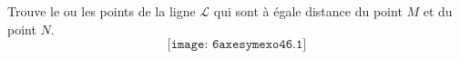 Trouve le ou les points  de la ligne  $\mathscr{L}$ qui sont à égale distance du point $M$ et du point $N$.
\[\texttt{[image: 6axesymexo46.1]}\] 